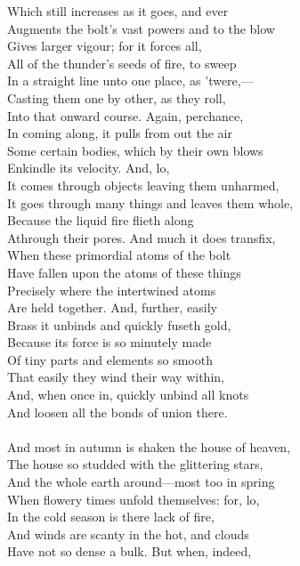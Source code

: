 Which still increases as it goes, and ever\\
Augments the bolt's vast powers and to the blow\\
Gives larger vigour; for it forces all,\\
All of the thunder's seeds of fire, to sweep\\
In a straight line unto one place, as 'twere,—\\
Casting them one by other, as they roll,\\
Into that onward course. Again, perchance,\\
In coming along, it pulls from out the air\\
Some certain bodies, which by their own blows\\
Enkindle its velocity. And, lo,\\
It comes through objects leaving them unharmed,\\
It goes through many things and leaves them whole,\\
Because the liquid fire flieth along\\
Athrough their pores. And much it does transfix,\\
When these primordial atoms of the bolt\\
Have fallen upon the atoms of these things\\
Precisely where the intertwined atoms\\
Are held together. And, further, easily\\
Brass it unbinds and quickly fuseth gold,\\
Because its force is so minutely made\\
Of tiny parts and elements so smooth\\
That easily they wind their way within,\\
And, when once in, quickly unbind all knots\\
And loosen all the bonds of union there.\\
\\
And most in autumn is shaken the house of heaven,\\
The house so studded with the glittering stars,\\
And the whole earth around—most too in spring\\
When flowery times unfold themselves: for, lo,\\
In the cold season is there lack of fire,\\
And winds are scanty in the hot, and clouds\\
Have not so dense a bulk. But when, indeed,\\

